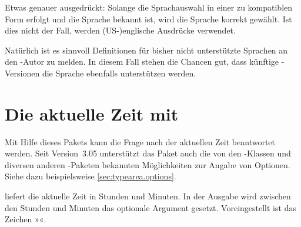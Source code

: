 \begin{Explain}
  Etwas genauer ausgedrückt: Solange die Sprachauswahl in einer zu
   kompatiblen Form erfolgt und die Sprache
   bekannt ist, wird die Sprache korrekt gewählt. Ist dies
  nicht der Fall, werden (US-)englische Ausdrücke verwendet.
\end{Explain}

Natürlich ist es sinnvoll Definitionen für bisher nicht unterstützte Sprachen
an den \KOMAScript-Autor zu melden. In diesem Fall stehen die Chancen gut,
dass künftige \KOMAScript-Versionen die Sprache ebenfalls unterstützen
werden.%
\EndIndexGroup
%
\EndIndexGroup


\chapter{Die aktuelle Zeit mit }
\BeginIndexGroup
{}

Mit Hilfe dieses Pakets kann die Frage nach der aktuellen Zeit beantwortet
werden. Seit Version~3.05 unterstützt das Paket auch die von den
\KOMAScript-Klassen und diversen anderen \KOMAScript-Paketen bekannten
Möglichkeiten zur Angabe von Optionen. Siehe dazu beispielsweise
\autoref{sec:typearea.options}.

\begin{Declaration}%
\end{Declaration}%
 liefert die aktuelle Zeit in Stunden und
Minuten. In der Ausgabe wird zwischen den Stunden und Minuten das optionale
Argument  gesetzt. Voreingestellt ist das Zeichen
»\PValue{:}«.

